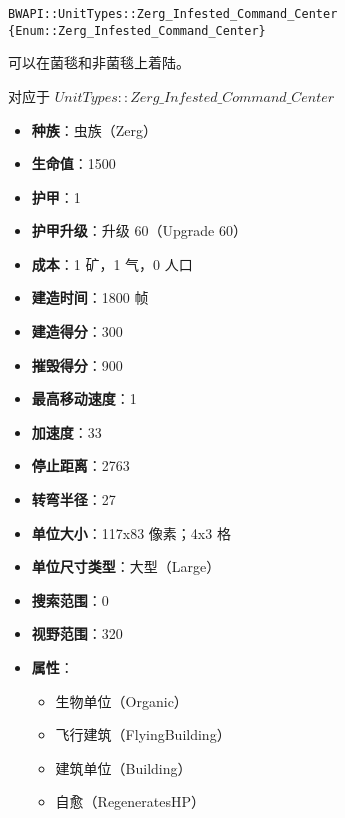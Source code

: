 \begin{tcolorbox}[colback=white, colframe=black!60!white, title=Zerg\_Infested\_Command\_Center(), arc=0mm]
    \begin{verbatim}
BWAPI::UnitTypes::Zerg_Infested_Command_Center {Enum::Zerg_Infested_Command_Center}
    \end{verbatim}
    \begin{note}
        可以在菌毯和非菌毯上着陆。
    \end{note}
    对应于  $UnitTypes::Zerg\_Infested\_Command\_Center$ 
    \begin{itemize}
        \item \textbf{种族}：虫族（Zerg）
        \item \textbf{生命值}：1500
        \item \textbf{护甲}：1
        \item \textbf{护甲升级}：升级 60（Upgrade 60）
        \item \textbf{成本}：1 矿，1 气，0 人口
        \item \textbf{建造时间}：1800 帧
        \item \textbf{建造得分}：300
        \item \textbf{摧毁得分}：900
        \item \textbf{最高移动速度}：1
        \item \textbf{加速度}：33
        \item \textbf{停止距离}：2763
        \item \textbf{转弯半径}：27
        \item \textbf{单位大小}：117x83 像素；4x3 格
        \item \textbf{单位尺寸类型}：大型（Large）
        \item \textbf{搜索范围}：0
        \item \textbf{视野范围}：320
        \item \textbf{属性}：
            \begin{itemize}
                \item 生物单位（Organic）
                \item 飞行建筑（FlyingBuilding）
                \item 建筑单位（Building）
                \item 自愈（RegeneratesHP）
            \end{itemize}
    \end{itemize}
\end{tcolorbox}

